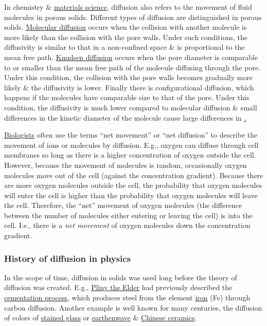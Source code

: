 \documentclass{article}
\begin{document}
In chemistry \& \href{https://en.wikipedia.org/wiki/Materials_science}{materials science}, diffusion also refers to the movement of fluid molecules in porous solids. Different types of diffusion are distinguished in porous solids. \href{https://en.wikipedia.org/wiki/Molecular_diffusion}{Molecular diffusion} occurs when the collision with another molecule is more likely than the collision with the pore walls. Under such conditions, the diffusivity is similar to that in a non-confined space \& is proportional to the mean free path. \href{https://en.wikipedia.org/wiki/Knudsen_diffusion}{Knudsen diffusion} occurs when the pore diameter is comparable to or smaller than the mean free path of the molecule diffusing through the pore. Under this condition, the collision with the pore walls becomes gradually more likely \& the diffusivity is lower. Finally there is configurational diffusion, which happens if the molecules have comparable size to that of the pore. Under this condition, the diffusivity is much lower compared to molecular diffusion \& small differences in the kinetic diameter of the molecule cause large differences in \href{mass diffusivity}.

\href{https://en.wikipedia.org/wiki/Biologist}{Biologists} often use the terms ``net movement'' or ``net diffusion'' to describe the movement of ions or molecules by diffusion. E.g., oxygen can diffuse through cell membranes so long as there is a higher concentration of oxygen outside the cell. However, because the movement of molecules is random, occasionally oxygen molecules move out of the cell (against the concentration gradient). Because there are more oxygen molecules outside the cell, the probability that oxygen molecules will enter the cell is higher than the probability that oxygen molecules will leave the cell. Therefore, the ``net'' movement of oxygen molecules (the difference between the number of molecules either entering or leaving the cell) is into the cell. I.e., there is a {\it net movement} of oxygen molecules down the concentration gradient.

\subsubsection{History of diffusion in physics}
In the scope of time, diffusion in solids was used long before the theory of diffusion was created. E.g., \href{https://en.wikipedia.org/wiki/Pliny_the_Elder}{\sc Pliny the Elder} had previously described the \href{https://en.wikipedia.org/wiki/Cementation_process}{cementation process}, which produces steel from the element \href{https://en.wikipedia.org/wiki/Iron}{iron} (Fe) through carbon diffusion. Another example is well known for many centuries, the diffusion of colors of \href{https://en.wikipedia.org/wiki/Stained_glass}{stained glass} or \href{https://en.wikipedia.org/wiki/Earthenware}{earthenwave} \& \href{https://en.wikipedia.org/wiki/Chinese_ceramics}{Chinese ceramics}.
\end{document}
